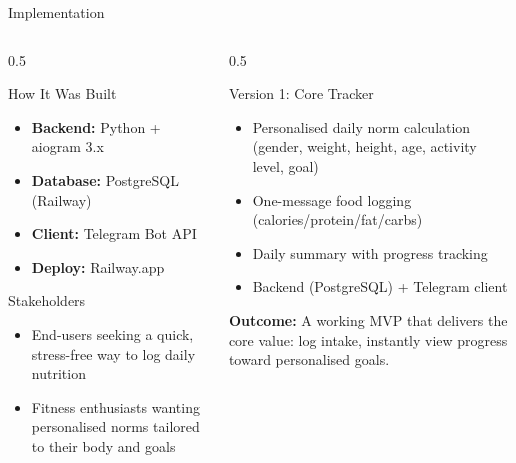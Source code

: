 \documentclass[aspectratio=169]{beamer}
\begin{document}
\begin{frame}{Implementation}
    \begin{columns}[T]
        \begin{column}{0.5\textwidth}
            \begin{block}{\faCode{} How It Was Built}
                \begin{itemize}
                    \small
                    \item \textbf{Backend:} Python + aiogram 3.x
                    \item \textbf{Database:} PostgreSQL (Railway)
                    \item \textbf{Client:} Telegram Bot API
                    \item \textbf{Deploy:} Railway.app
                \end{itemize}
            \end{block}

            \begin{block}{\faUsers{} Stakeholders}
                \begin{itemize}
                    \small
                    \item End-users seeking a quick, stress-free way to log daily nutrition
                    \item Fitness enthusiasts wanting personalised norms tailored to their body and goals
                \end{itemize}
            \end{block}
        \end{column}
        \begin{column}{0.5\textwidth}
            \begin{block}{\faCogs{} Version 1: Core Tracker}
                \begin{itemize}
                    \small
                    \item Personalised daily norm calculation (gender, weight, height, age, activity level, goal)
                    \item One-message food logging (calories/protein/fat/carbs)
                    \item Daily summary with progress tracking
                    \item Backend (PostgreSQL) + Telegram client
                \end{itemize}
                \smallskip
                \textbf{Outcome:} A working MVP that delivers the core value: log intake, instantly view progress toward personalised goals.
            \end{block}
        \end{column}
    \end{columns}
\end{frame}
\end{document}
